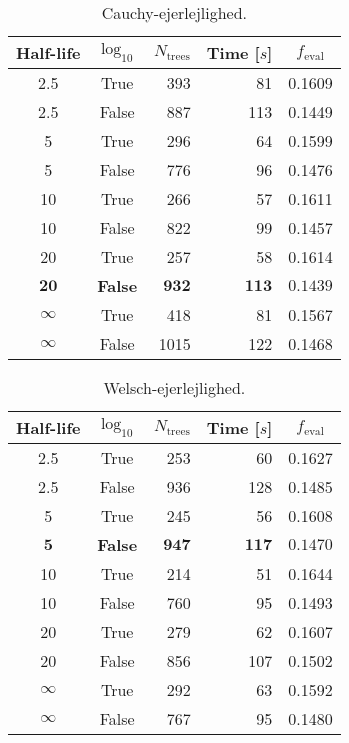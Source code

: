 
\begin{table}[]
  \begin{tabular}{@{}ccrrc@{}}
    Half-life & $\log_{10}$ & $N_\mathrm{trees}$ & Time [$s$] & $f_\mathrm{eval}$ \\
    \midrule
    \num{2.5} & True & \num{393} & \num{81} & \num{0.1609} \\
    \num{2.5} & False & \num{887} & \num{113} & \num{0.1449} \\
    \num{5} & True & \num{296} & \num{64} & \num{0.1599} \\
    \num{5} & False & \num{776} & \num{96} & \num{0.1476} \\
    \num{10} & True & \num{266} & \num{57} & \num{0.1611} \\
    \num{10} & False & \num{822} & \num{99} & \num{0.1457} \\
    \num{20} & True & \num{257} & \num{58} & \num{0.1614} \\
    $\mathbf{20}$ & \textbf{False} & $\mathbf{932}$ & $\mathbf{113}$ & $\mathbf{0.1439}$ \\
    $\infty$ & True & \num{418} & \num{81} & \num{0.1567} \\
    $\infty$ & False & \num{1015} & \num{122} & \num{0.1468} \\
  \end{tabular}
  \caption{\label{tab:h:HPO_initial_Cauchy-ejerlejlighed}Cauchy-ejerlejlighed.}
\end{table}


\begin{table}[]
  \begin{tabular}{@{}ccrrc@{}}
    Half-life & $\log_{10}$ & $N_\mathrm{trees}$ & Time [$s$] & $f_\mathrm{eval}$ \\
    \midrule
    \num{2.5} & True & \num{253} & \num{60} & \num{0.1627} \\
    \num{2.5} & False & \num{936} & \num{128} & \num{0.1485} \\
    \num{5} & True & \num{245} & \num{56} & \num{0.1608} \\
    $\mathbf{5}$ & \textbf{False} & $\mathbf{947}$ & $\mathbf{117}$ & $\mathbf{0.1470}$ \\
    \num{10} & True & \num{214} & \num{51} & \num{0.1644} \\
    \num{10} & False & \num{760} & \num{95} & \num{0.1493} \\
    \num{20} & True & \num{279} & \num{62} & \num{0.1607} \\
    \num{20} & False & \num{856} & \num{107} & \num{0.1502} \\
    $\infty$ & True & \num{292} & \num{63} & \num{0.1592} \\
    $\infty$ & False & \num{767} & \num{95} & \num{0.1480} \\
  \end{tabular}
  \caption{\label{tab:h:HPO_initial_Welsch-ejerlejlighed}Welsch-ejerlejlighed.}
\end{table}

